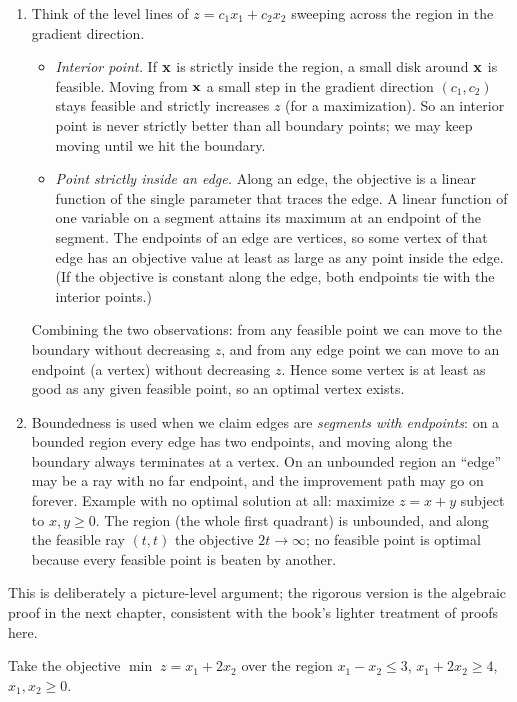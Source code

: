 \begin{enumerate}
\item Think of the level lines of $z = c_1 x_1 + c_2 x_2$ sweeping across the region in the gradient direction.
\begin{itemize}
\item \emph{Interior point.} If $\mathbf{x}$ is strictly inside the region, a small disk around $\mathbf{x}$ is feasible. Moving from $\mathbf{x}$ a small step in the gradient direction $(c_1, c_2)$ stays feasible and strictly increases $z$ (for a maximization). So an interior point is never strictly better than all boundary points; we may keep moving until we hit the boundary.
\item \emph{Point strictly inside an edge.} Along an edge, the objective is a linear function of the single parameter that traces the edge. A linear function of one variable on a segment attains its maximum at an endpoint of the segment. The endpoints of an edge are vertices, so some vertex of that edge has an objective value at least as large as any point inside the edge. (If the objective is constant along the edge, both endpoints tie with the interior points.)
\end{itemize}
Combining the two observations: from any feasible point we can move to the boundary without decreasing $z$, and from any edge point we can move to an endpoint (a vertex) without decreasing $z$. Hence some vertex is at least as good as any given feasible point, so an optimal vertex exists.
\item Boundedness is used when we claim edges are \emph{segments with endpoints}: on a bounded region every edge has two endpoints, and moving along the boundary always terminates at a vertex. On an unbounded region an ``edge'' may be a ray with no far endpoint, and the improvement path may go on forever. Example with no optimal solution at all: maximize $z = x + y$ subject to $x, y \geq 0$. The region (the whole first quadrant) is unbounded, and along the feasible ray $(t,t)$ the objective $2t \to \infty$; no feasible point is optimal because every feasible point is beaten by another.
\end{enumerate}
This is deliberately a picture-level argument; the rigorous version is the algebraic proof in the next chapter, consistent with the book's lighter treatment of proofs here.

Take the objective $\min\; z = x_1 + 2x_2$ over the region $x_1 - x_2 \leq 3$, $x_1 + 2x_2 \geq 4$, $x_1, x_2 \geq 0$.

